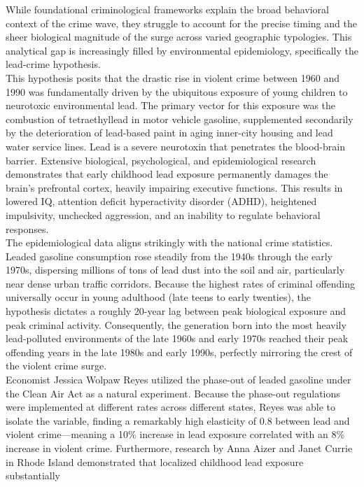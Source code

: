 \documentclass[
]{article}
\begin{document}
While foundational criminological frameworks explain the broad behavioral
context of the crime wave, they struggle to account for the precise
timing and the sheer biological magnitude of the surge across varied
geographic typologies. This analytical gap is increasingly filled by
environmental epidemiology, specifically the lead-crime hypothesis.\\
This hypothesis posits that the drastic rise in violent crime between
1960 and 1990 was fundamentally driven by the ubiquitous exposure of
young children to neurotoxic environmental lead. The primary vector for
this exposure was the combustion of tetraethyllead in motor vehicle
gasoline, supplemented secondarily by the deterioration of lead-based
paint in aging inner-city housing and lead water service lines. Lead is
a severe neurotoxin that penetrates the blood-brain barrier. Extensive
biological, psychological, and epidemiological research demonstrates
that early childhood lead exposure permanently damages the brain's
prefrontal cortex, heavily impairing executive functions. This results
in lowered IQ, attention deficit hyperactivity disorder (ADHD),
heightened impulsivity, unchecked aggression, and an inability to
regulate behavioral responses.\\
The epidemiological data aligns strikingly with the national crime
statistics. Leaded gasoline consumption rose steadily from the 1940s
through the early 1970s, dispersing millions of tons of lead dust into
the soil and air, particularly near dense urban traffic corridors.
Because the highest rates of criminal offending universally occur in
young adulthood (late teens to early twenties), the hypothesis dictates
a roughly 20-year lag between peak biological exposure and peak criminal
activity. Consequently, the generation born into the most heavily
lead-polluted environments of the late 1960s and early 1970s reached
their peak offending years in the late 1980s and early 1990s, perfectly
mirroring the crest of the violent crime surge.\\
Economist Jessica Wolpaw Reyes utilized the phase-out of leaded gasoline
under the Clean Air Act as a natural experiment. Because the phase-out
regulations were implemented at different rates across different states,
Reyes was able to isolate the variable, finding a remarkably high
elasticity of 0.8 between lead and violent crime---meaning a 10\%
increase in lead exposure correlated with an 8\% increase in violent
crime. Furthermore, research by Anna Aizer and Janet Currie in Rhode
Island demonstrated that localized childhood lead exposure substantially
\end{document}
